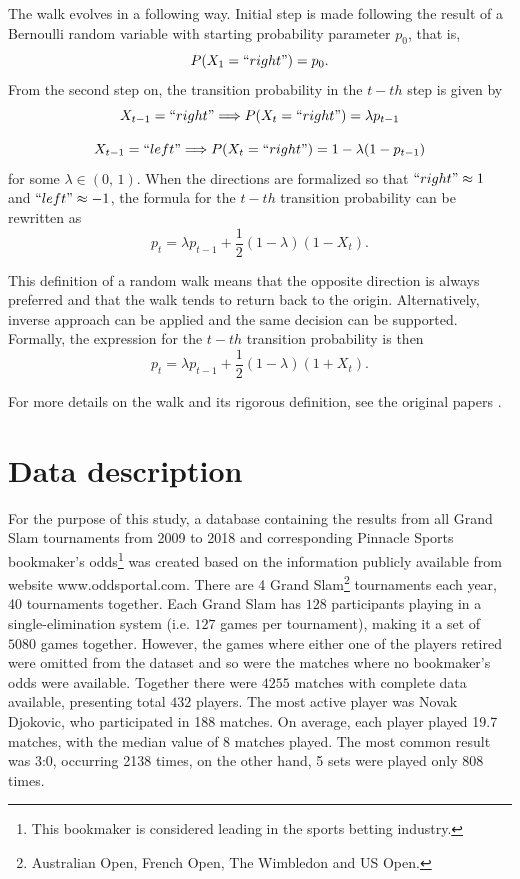 \documentclass{easychair}
\begin{document}
The walk evolves in a following way. Initial step is made following
the result of a Bernoulli random variable with starting probability
parameter $p_{0}$, that is, 
\[
P(X_{1}=``right")=p_{0}.
\]
 From the second step on, the transition probability in the $t-th$
step is given by 
\[
X_{t-1}=``right"\Longrightarrow P(X_{t}=``right")=\lambda p_{t-1}
\]

\[
X_{t-1}=``left"\Longrightarrow P(X_{t}=``right")=1-\lambda(1-p_{t-1})
\]
 for some $\lambda\in(0,\,1).$ When the directions are formalized
so that $``right"\approx1$ and $``left"\approx-1$, the formula for
the $t-th$ transition probability can be rewritten as
\begin{equation}
p_{t}=\lambda p_{t-1}+\frac{1}{2}(1-\lambda)(1-X_{t}).\label{eq:suc_punished}
\end{equation}

This definition of a random walk means that the opposite direction
is always preferred and that the walk tends to return back to the
origin. Alternatively, inverse approach can be applied and the same
decision can be supported. Formally, the expression for the $t-th$
transition probability is then 
\begin{equation}
p_{t}=\lambda p_{t-1}+\frac{1}{2}(1-\lambda)(1+X_{t}).\label{eq:suc_rew}
\end{equation}

For more details on the walk and its rigorous definition, see the
original papers \cite{ja2017ddny,ja2019teze}.

\section{Data description\label{sec:Data-description}}

For the purpose of this study, a database containing the results from
all Grand Slam tournaments from 2009 to 2018 and corresponding Pinnacle
Sports bookmaker's odds\footnote{This bookmaker is considered leading in the sports betting industry.}
was created based on the information publicly available from website
www.oddsportal.com. There are 4 Grand Slam\footnote{Australian Open, French Open, The Wimbledon and US Open.}
tournaments each year, 40 tournaments together. Each Grand Slam has
$128$ participants playing in a single-elimination system (i.e. $127$
games per tournament), making it a set of $5080$ games together.
However, the games where either one of the players retired were omitted
from the dataset and so were the matches where no bookmaker's odds
were available. Together there were $4255$ matches with complete
data available, presenting total $432$ players. The most active player
was Novak Djokovic, who participated in 188 matches. On average, each
player played 19.7 matches, with the median value of 8 matches played.
The most common result was 3:0, occurring 2138 times, on the other
hand, 5 sets were played only 808 times.
\end{document}
